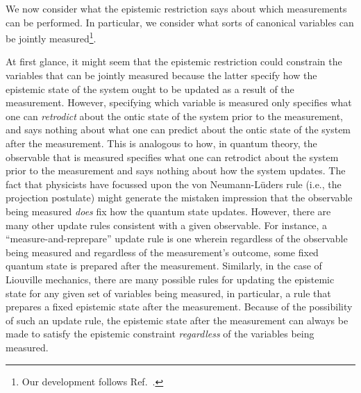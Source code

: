 \documentclass[pra,superscriptaddress,nofootinbib,12pt]{revtex4-2}
\begin{document}
We now consider what the epistemic restriction says about which measurements can be performed.  In particular, we consider what sorts of canonical variables can be jointly measured\footnote{Our development follows Ref.~\cite{SchreiberSpekunpublished}.}.


At first glance, it might seem that the epistemic restriction could constrain the variables that can be jointly measured because the latter specify how the epistemic state of the system ought to be updated as a result of the measurement.  However, specifying which variable is measured only specifies what one can \emph{retrodict} about the ontic state of the system prior to the measurement, and says nothing about what one can predict about the ontic state of the system after the measurement.  This is analogous to how, in quantum theory, the observable that is measured specifies what one can retrodict about the system prior to the measurement and says nothing about how the system updates.  The fact that physicists have focussed upon the von Neumann-L\"{u}ders rule (i.e., the projection postulate) might generate the mistaken impression that the observable being measured \emph{does} fix how the quantum state updates.  However, there are many other update rules consistent with a given observable. For instance, a ``measure-and-reprepare'' update rule is one wherein regardless of the observable being measured and regardless of the measurement's outcome, some fixed quantum state is prepared after the measurement.  Similarly, in the case of Liouville mechanics, there are many possible rules for updating the epistemic state for any given set of variables being measured, in particular, a rule that prepares a fixed epistemic state after the measurement. Because of the possibility of such an update rule, the epistemic state after the measurement can always be made to satisfy the epistemic constraint \emph{regardless} of the variables being measured.
\end{document}
